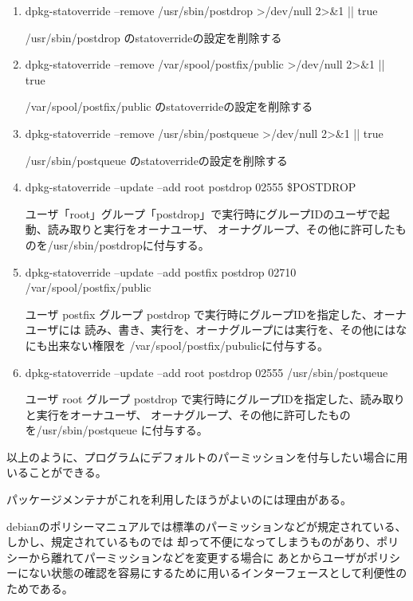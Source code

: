 \documentclass[mingoth,a4paper]{jsarticle}
\begin{document}
  \begin{enumerate}

  \item dpkg-statoverride --remove /usr/sbin/postdrop >/dev/null 2>\&1 || true

        /usr/sbin/postdrop のstatoverrideの設定を削除する

  \item dpkg-statoverride --remove /var/spool/postfix/public >/dev/null 2>\&1 || true

        /var/spool/postfix/public のstatoverrideの設定を削除する

  \item dpkg-statoverride --remove /usr/sbin/postqueue >/dev/null 2>\&1 || true

        /usr/sbin/postqueue のstatoverrideの設定を削除する

  \item dpkg-statoverride --update --add root postdrop 02555 \$POSTDROP

        ユーザ「root」グループ「postdrop」で実行時にグループIDのユーザで起動、読み取りと実行をオーナユーザ、
        オーナグループ、その他に許可したものを/usr/sbin/postdropに付与する。

  \item dpkg-statoverride --update --add postfix postdrop 02710 /var/spool/postfix/public

        ユーザ postfix グループ postdrop で実行時にグループIDを指定した、オーナユーザには
        読み、書き、実行を、オーナグループには実行を、その他にはなにも出来ない権限を
        /var/spool/postfix/pubulicに付与する。

  \item dpkg-statoverride --update --add root postdrop 02555 /usr/sbin/postqueue

        ユーザ root グループ postdrop で実行時にグループIDを指定した、読み取りと実行をオーナユーザ、
        オーナグループ、その他に許可したものを/usr/sbin/postqueue に付与する。

  \end{enumerate}

  以上のように、プログラムにデフォルトのパーミッションを付与したい場合に用いることができる。

  パッケージメンテナがこれを利用したほうがよいのには理由がある。

  debianのポリシーマニュアルでは標準のパーミッションなどが規定されている、しかし、規定されているものでは
  却って不便になってしまうものがあり、ポリシーから離れてパーミッションなどを変更する場合に
  あとからユーザがポリシーにない状態の確認を容易にするために用いるインターフェースとして利便性のためである。
\end{document}
